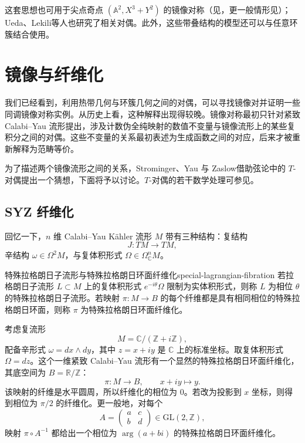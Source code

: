 这套思想也可用于尖点奇点 $(\mathbb A^2,X^3+Y^2)$ 的镜像对称（见，更一般情形见）；Ueda、Lekili等人也研究了相关对偶。此外，这些带叠结构的模型还可以与任意环簇结合使用。

\section{镜像与纤维化}\label{sec:mirrors-and-fibrations}
我们已经看到，利用热带几何与环簇几何之间的对偶，可以寻找镜像对并证明一些同调镜像对称实例。从历史上看，这种解释出现得较晚。镜像对称最初只针对紧致 Calabi--Yau 流形提出，涉及计数伪全纯映射的数值不变量与镜像流形上的某些复积分之间的对偶。这些不变量的关系最初表述为生成函数之间的对应，后来才被重新解释为范畴等价。

为了描述两个镜像流形之间的关系，Strominger、Yau 与 Zaslow借助弦论中的 $T$-对偶提出一个猜想，下面将予以讨论。$T$-对偶的若干数学处理可参见。

\subsection{SYZ 纤维化}\label{subsec:syz-fibrations}
回忆一下，$n$ 维 Calabi--Yau Kähler 流形 $M$ 带有三种结构：复结构
\[
  J\colon TM\to TM,
\]
辛结构 $\omega\in\Omega^2M$，与复体积形式 $\Omega\in\Omega^n_{\mathbb C}M$。

\begin{definition}{特殊拉格朗日子流形与特殊拉格朗日环面纤维化}{special-lagrangian-fibration}
若拉格朗日子流形 $L\subset M$ 上的复体积形式 $e^{-i\theta}\Omega$ 限制为实体积形式，则称 $L$ 为相位 $\theta$ 的特殊拉格朗日子流形。若映射 $\pi\colon M\to B$ 的每个纤维都是具有相同相位的特殊拉格朗日环面，则称 $\pi$ 为特殊拉格朗日环面纤维化。
\end{definition}

\begin{example}[椭圆曲线的特殊拉格朗日纤维化]
考虑复流形
\[
  M=\mathbb C/(\mathbb Z+i\mathbb Z),
\]
配备辛形式 $\omega=dx\wedge dy$，其中 $z=x+iy$ 是 $\mathbb C$ 上的标准坐标。取复体积形式 $\Omega=dz$。这个一维紧致 Calabi--Yau 流形有一个显然的特殊拉格朗日环面纤维化，其底空间为 $B=\mathbb R/\mathbb Z$：
\[
  \pi\colon M\to B,\qquad x+iy\longmapsto y.
\]
该映射的纤维是水平圆周，所以纤维化的相位为 $0$。若改为投影到 $x$ 坐标，则得到相位为 $\pi/2$ 的纤维化。更一般地，对每个
\[
  A=\begin{pmatrix}a&c\\b&d\end{pmatrix}\in\mathrm{GL}(2,\mathbb Z),
\]
映射 $\pi\circ A^{-1}$ 都给出一个相位为 $\arg(a+bi)$ 的特殊拉格朗日环面纤维化。
\end{example}

